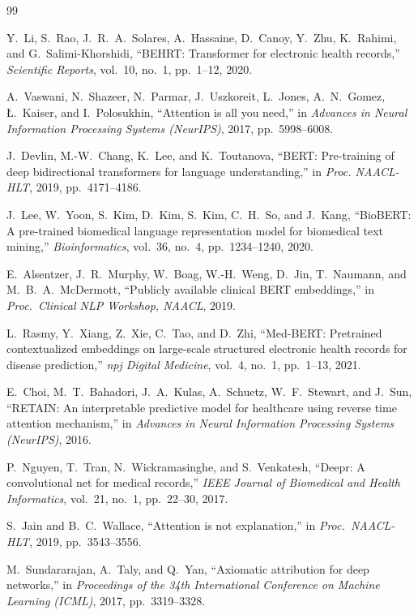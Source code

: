 \documentclass[11pt]{article}
\begin{document}
\begin{thebibliography}{99}

Y.~Li, S.~Rao, J.~R.~A.~Solares, A.~Hassaine, D.~Canoy, Y.~Zhu, K.~Rahimi, and
G.~Salimi-Khorshidi, ``BEHRT: Transformer for electronic health records,''
\emph{Scientific Reports}, vol.~10, no.~1, pp.~1--12, 2020.

A.~Vaswani, N.~Shazeer, N.~Parmar, J.~Uszkoreit, L.~Jones, A.~N.~Gomez,
\L.~Kaiser, and I.~Polosukhin, ``Attention is all you need,'' in
\emph{Advances in Neural Information Processing Systems (NeurIPS)}, 2017,
pp.~5998--6008.

J.~Devlin, M.-W.~Chang, K.~Lee, and K.~Toutanova, ``BERT: Pre-training of deep
bidirectional transformers for language understanding,'' in \emph{Proc.
NAACL-HLT}, 2019, pp.~4171--4186.

J.~Lee, W.~Yoon, S.~Kim, D.~Kim, S.~Kim, C.~H.~So, and J.~Kang, ``BioBERT: A
pre-trained biomedical language representation model for biomedical text
mining,'' \emph{Bioinformatics}, vol.~36, no.~4, pp.~1234--1240, 2020.

E.~Alsentzer, J.~R.~Murphy, W.~Boag, W.-H.~Weng, D.~Jin, T.~Naumann, and
M.~B.~A.~McDermott, ``Publicly available clinical BERT embeddings,'' in
\emph{Proc.\ Clinical NLP Workshop, NAACL}, 2019.

L.~Rasmy, Y.~Xiang, Z.~Xie, C.~Tao, and D.~Zhi, ``Med-BERT: Pretrained
contextualized embeddings on large-scale structured electronic health records
for disease prediction,'' \emph{npj Digital Medicine}, vol.~4, no.~1,
pp.~1--13, 2021.

E.~Choi, M.~T.~Bahadori, J.~A.~Kulas, A.~Schuetz, W.~F.~Stewart, and
J.~Sun, ``RETAIN: An interpretable predictive model for healthcare using
reverse time attention mechanism,'' in \emph{Advances in Neural Information
Processing Systems (NeurIPS)}, 2016.

P.~Nguyen, T.~Tran, N.~Wickramasinghe, and S.~Venkatesh, ``Deepr: A
convolutional net for medical records,'' \emph{IEEE Journal of Biomedical and
Health Informatics}, vol.~21, no.~1, pp.~22--30, 2017.

S.~Jain and B.~C.~Wallace, ``Attention is not explanation,'' in \emph{Proc.\
NAACL-HLT}, 2019, pp.~3543--3556.

M.~Sundararajan, A.~Taly, and Q.~Yan, ``Axiomatic attribution for deep
networks,'' in \emph{Proceedings of the 34th International Conference on
Machine Learning (ICML)}, 2017, pp.~3319--3328.


\end{thebibliography}
\end{document}
